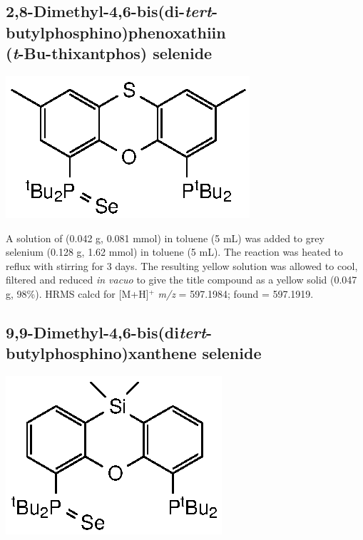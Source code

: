 
\subsection*{2,8-Dimethyl-4,6-bis(di-\emph{tert}-butylphosphino)phenoxathiin \\(\emph{t}-Bu-thixantphos) selenide}
\begin{structure}[h]
\begin{center}
\includegraphics{../Structures/StBuSe.eps}
\end{center}
\end{structure}

A solution of \tButhixantphos{} (0.042 g, 0.081 mmol) in toluene (5 mL) was added to grey selenium (0.128 g, 1.62 mmol) in toluene (5 mL).  The reaction was heated to reflux with stirring for 3 days.  The resulting yellow solution was allowed to cool, filtered and reduced \emph{in vacuo} to give the title compound as a yellow solid (0.047 g, 98\%).   
HRMS calcd for  [M+H]$^+$ \emph{m/z} = 597.1984; found = 597.1919.


\subsection*{9,9-Dimethyl-4,6-bis(di\emph{tert}-butylphosphino)xanthene selenide}
\begin{structure}[h]
\begin{center}
\includegraphics{../Structures/CtBuSe.eps}
\end{center}
\end{structure}

